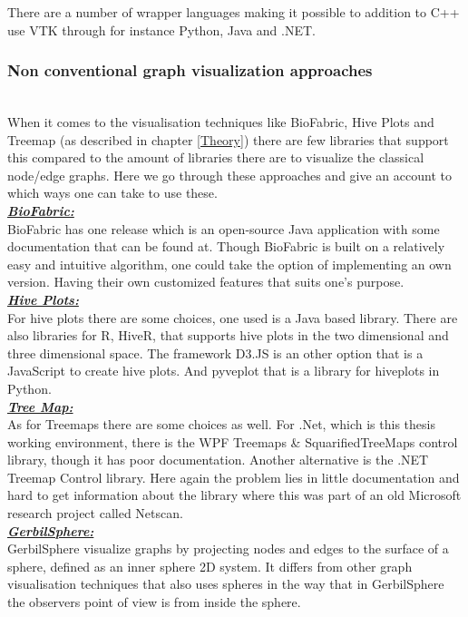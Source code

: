 \documentclass[a4paper,11pt]{kth-mag}
\begin{document}
\begin{appendices}
There are a number of wrapper languages making it possible to addition to C++ use VTK through for instance  Python, Java and .NET.\\
\subsubsection{Non conventional graph visualization approaches}\\
When it comes to the visualisation techniques like BioFabric, Hive Plots and Treemap (as described in chapter \ref{Theory}) there are few libraries that support this compared to the amount of libraries there are
 to visualize the classical node/edge graphs. Here we go through these approaches and give an account to which ways one can take to use these.\\
\newline
\textbf{\textit{\underline{BioFabric:}}}\\
\newline
BioFabric has one release which is an open-source Java application with some documentation that can be found at\cite{website:biofabricdoc}. Though BioFabric is built on a relatively easy and intuitive algorithm, one could
 take the option of implementing an own version. Having their own customized features that suits one's purpose.\\
\newline
\textbf{\textit{\underline{Hive Plots:}}}\\
\newline
For hive plots there are some choices, one used is a Java based library\cite{website:JHive}. There are also libraries for R\cite{website:R}, HiveR\cite{website:HiveR}, that supports hive plots in the two dimensional and three dimensional space.
The framework D3.JS\cite{website:D3JS} is an other option that is a JavaScript to create hive plots. And pyveplot\cite{website:pyveplot} that is a library for hiveplots in Python\cite{website:python}.\\
\newline
\textbf{\textit{\underline{Tree Map:}}}\\
\newline
As for Treemaps there are some choices as well. For .Net, which is this thesis working environment, there is the WPF Treemaps \& SquarifiedTreeMaps control library\cite{website:WPFTreeMaps}, though it has poor documentation.
 Another alternative is the .NET Treemap Control library\cite{website:devxTreeMap}. Here again the problem lies in little documentation and hard to get information about the library where this was part of an old Microsoft
 research project called Netscan.\\
\newline
\textbf{\textit{\underline{GerbilSphere:}}}\\
\newline
GerbilSphere visualize graphs by projecting nodes and edges to the surface of a sphere, defined as an inner sphere 2D system. It differs from other graph visualisation techniques that also uses spheres
in the way that in GerbilSphere the observers point of view is from inside the sphere.


\end{appendices}
\end{document}
